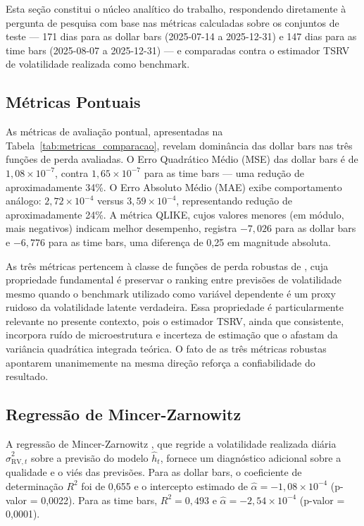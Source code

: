 Esta seção constitui o núcleo analítico do trabalho, respondendo diretamente à pergunta
de pesquisa com base nas métricas calculadas sobre os conjuntos de teste — 171 dias para
as dollar bars (2025-07-14 a 2025-12-31) e 147 dias para as time bars
(2025-08-07 a 2025-12-31) — e comparadas contra o estimador TSRV de volatilidade
realizada como benchmark.

\subsection{Métricas Pontuais}
\label{subsec:metricas_pontuais}

As métricas de avaliação pontual, apresentadas na Tabela~\ref{tab:metricas_comparacao},
revelam dominância das dollar bars nas três funções de perda avaliadas. O Erro Quadrático
Médio (MSE) das dollar bars é de $1{,}08 \times 10^{-7}$, contra $1{,}65 \times 10^{-7}$
para as time bars — uma redução de aproximadamente 34\%. O Erro Absoluto Médio (MAE)
exibe comportamento análogo: $2{,}72 \times 10^{-4}$ versus $3{,}59 \times 10^{-4}$,
representando redução de aproximadamente 24\%. A métrica QLIKE, cujos valores menores
(em módulo, mais negativos) indicam melhor desempenho, registra $-7{,}026$ para as dollar
bars e $-6{,}776$ para as time bars, uma diferença de 0,25 em magnitude absoluta.

As três métricas pertencem à classe de funções de perda robustas de \citet{Patton2011},
cuja propriedade fundamental é preservar o ranking entre previsões de volatilidade mesmo
quando o benchmark utilizado como variável dependente é um proxy ruidoso da volatilidade
latente verdadeira. Essa propriedade é particularmente relevante no presente contexto,
pois o estimador TSRV, ainda que consistente, incorpora ruído de microestrutura e
incerteza de estimação que o afastam da variância quadrática integrada teórica. O fato
de as três métricas robustas apontarem unanimemente na mesma direção reforça a
confiabilidade do resultado.

\subsection{Regressão de Mincer-Zarnowitz}
\label{subsec:mz}

A regressão de Mincer-Zarnowitz \citep{MincerZarnowitz1969}, que regride a volatilidade
realizada diária $\hat{\sigma}^2_{\text{RV},t}$ sobre a previsão do modelo
$\hat{h}_t$, fornece um diagnóstico adicional sobre a qualidade e o viés das previsões.
Para as dollar bars, o coeficiente de determinação $R^2$ foi de 0,655 e o intercepto
estimado de $\hat{\alpha} = -1{,}08 \times 10^{-4}$ (p-valor = 0,0022). Para as time bars,
$R^2 = 0{,}493$ e $\hat{\alpha} = -2{,}54 \times 10^{-4}$ (p-valor = 0,0001).

